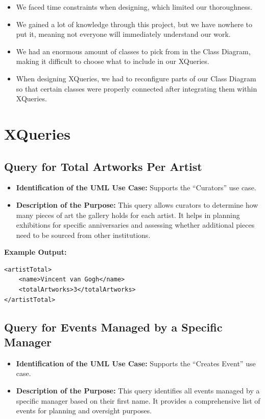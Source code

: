 \documentclass{article} %
\begin{document}
\begin{itemize}
    \item We faced time constraints when designing, which limited our thoroughness.
    \item We gained a lot of knowledge through this project, but we have nowhere to put it, meaning not everyone will immediately understand our work.
    \item We had an enormous amount of classes to pick from in the Class Diagram, making it difficult to choose what to include in our XQueries.
    \item When designing XQueries, we had to reconfigure parts of our Class Diagram so that certain classes were properly connected after integrating them within XQueries.
\end{itemize}

\newpage
\section{XQueries}
\subsection{Query for Total Artworks Per Artist}
\begin{itemize}
    \item \textbf{Identification of the UML Use Case:} Supports the ``Curators'' use case.
    \item \textbf{Description of the Purpose:} This query allows curators to determine how many pieces of art the gallery holds for each artist. It helps in planning exhibitions for specific anniversaries and assessing whether additional pieces need to be sourced from other institutions.
\end{itemize}

\textbf{Example Output:}
\begin{verbatim}
<artistTotal>
    <name>Vincent van Gogh</name>
    <totalArtworks>3</totalArtworks>
</artistTotal>
\end{verbatim}

\subsection{Query for Events Managed by a Specific Manager}
\begin{itemize}
    \item \textbf{Identification of the UML Use Case:} Supports the ``Creates Event'' use case.
    \item \textbf{Description of the Purpose:} This query identifies all events managed by a specific manager based on their first name. It provides a comprehensive list of events for planning and oversight purposes.
\end{itemize}
\end{document}
